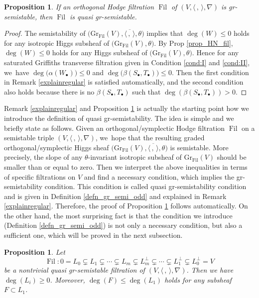 \documentclass[JEP,XML,SOM,Unicode,published]{cedram}
\newcommand{\sbullet}{{\scriptscriptstyle\bullet}}
\newcommand{\grsemistable}{gr\nobreakdash-semi\-stable\xspace}
\DeclareMathOperator{\Filt}{Fil}
\newcommand{\Gr}{\mathrm{Gr}}
\theoremstyle{plain}
\newtheorem{prop}[thm]{Proposition}
\theoremstyle{definition}
\begin{document}
\begin{prop}\label{ssregular}
If an orthogonal Hodge filtration $\Filt$ of $(V,\langle \,, \, \rangle,\nabla)$ is \grsemistable, then $\Filt$ is quasi \grsemistable.
\end{prop}

\begin{proof}
The semistability of $\big(\Gr_{\Filt}(V), \overline{\langle \,, \, \rangle}, \theta\big)$ implies that $\deg(W)\leq 0$ holds for any isotropic Higgs subsheaf of $\big(\Gr_{\Filt}(V),\theta\big)$. By Prop \ref{prop_HN_fil}, $\deg(W)\leq 0$ holds for any Higgs subsheaf of $\big(\Gr_{\Filt}(V),\theta\big)$. Hence for any saturated Griffiths transverse filtration given in Condition \eqref{cond:I} and \eqref{cond:II}, we~have $\deg\big(\alpha(W_\sbullet)\big)\leq 0$ and $\deg\big(\beta(S_\sbullet,T_\sbullet)\big)\leq0$. Then the first condition in Remark \ref{explainregular} is satisfied automatically, and the second condition also holds because there is no $\beta(S_\sbullet,T_\sbullet)$ such that $\deg( \beta(S_\sbullet,T_\sbullet)) > 0$.
\end{proof}

Remark \ref{explainregular} and Proposition \ref{ssregular} is actually the starting point how we introduce the definition of quasi gr-semistability. The idea is simple and we briefly state as follows. Given an orthogonal/symplectic Hodge filtration $\Filt$ on a semistable triple $(V, \langle \,,\, \rangle, \nabla)$, we~hope that the resulting graded orthogonal/symplectic Higgs sheaf $\big(\Gr_{\Filt}(V), \overline{\langle \,, \, \rangle}, \theta\big)$ is semistable. More precisely, the slope of any $\theta$-invariant isotropic subsheaf of $\Gr_{\Filt}(V)$ should be smaller than or equal to zero. Then we interpret the above inequalities in terms of specific filtrations on $V$ and find a necessary condition, which implies the gr-semistability condition. This condition is called quasi gr-semistability condition and is given in Definition \ref{defn_gr_semi_odd} and explained in Remark \ref{explainregular}. Therefore, the proof of Proposition \ref{ssregular} follows automatically. On the other hand, the most surprising fact is that the condition we introduce (Definition \ref{defn_gr_semi_odd}) is not only a necessary condition, but also a sufficient one, which will be proved in the next subsection.

\begin{prop}\label{positive}
Let
\[
\Filt: 0= L_0 \subsetneq L_1 \subsetneq \cdots \subsetneq L_m \subsetneq L_m^\perp\subsetneq\cdots \subsetneq L_1^\perp\subsetneq L_0^\perp= V
\]
be a nontrivial quasi \grsemistable filtration of $(V, \langle \,, \, \rangle, \nabla)$. Then we have $\deg(L_i)\geq 0$. Moreover, $\deg(F)\leq \deg(L_1)$ holds for any subsheaf $F\subset L_1$.
\end{prop}
\end{document}
